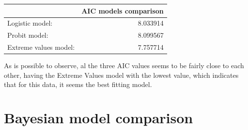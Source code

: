 \documentclass[]{article}
\newenvironment{Shaded}{\begin{snugshade}}{\end{snugshade}}
\newcommand{\DataTypeTok}[1]{\textcolor[rgb]{0.13,0.29,0.53}{#1}}
\newcommand{\DecValTok}[1]{\textcolor[rgb]{0.00,0.00,0.81}{#1}}
\newcommand{\KeywordTok}[1]{\textcolor[rgb]{0.13,0.29,0.53}{\textbf{#1}}}
\newcommand{\NormalTok}[1]{#1}
\newcommand{\OperatorTok}[1]{\textcolor[rgb]{0.81,0.36,0.00}{\textbf{#1}}}
\newcommand{\StringTok}[1]{\textcolor[rgb]{0.31,0.60,0.02}{#1}}
\begin{document}
\begin{Shaded}
\end{Shaded}

\begin{table}[!h]
\centering
\begin{tabular}{lr}
\toprule
  & AIC models comparison\\
\midrule
\rowcolor{gray!6}  Logistic model: & 8.033914\\
Probit model: & 8.099567\\
\rowcolor{gray!6}  Extreme values model: & 7.757714\\
\bottomrule
\end{tabular}
\end{table}

As is possible to observe, al the three AIC values seems to be fairly
close to each other, having the Extreme Values model with the lowest
value, which indicates that for this data, it seems the best fitting
model.

\hypertarget{bayesian-model-comparison}{%
\section{Bayesian model comparison}\label{bayesian-model-comparison}}
\end{document}
